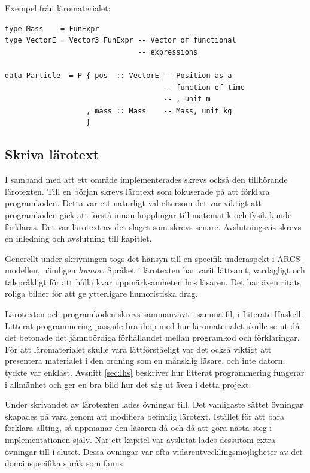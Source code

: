 Exempel från läromaterialet:
\begin{lstlisting}[frame=none, belowskip=-0.5\baselineskip, xleftmargin=0.5in]
type Mass    = FunExpr
type VectorE = Vector3 FunExpr -- Vector of functional 
                               -- expressions

data Particle  = P { pos  :: VectorE -- Position as a 
                                     -- function of time
                                     -- , unit m
                   , mass :: Mass    -- Mass, unit kg
                   }
\end{lstlisting}

\subsection{Skriva lärotext}

I samband med att ett område implementerades skrevs också den tillhörande
lärotexten. Till en början skrevs lärotext som fokuserade på att förklara
programkoden. Detta var ett naturligt val eftersom det var viktigt att
programkoden gick att förstå innan kopplingar till matematik och fysik kunde
förklaras. Det var lärotext av det slaget som skrevs senare.
Avslutningsvis skrevs en inledning och avslutning till kapitlet.

Generellt under skrivningen togs det hänsyn till en specifik underaspekt i ARCS-modellen, nämligen \textit{humor}. Språket i lärotexten har varit lättsamt, vardagligt och talspråkligt för att hålla kvar uppmärksamheten hos läsaren. Det har även ritats roliga bilder för att ge ytterligare humoristiska drag.

Lärotexten och programkoden skrevs sammanvävt i samma fil, i Literate
Haskell. Litterat programmering passade bra ihop med
hur läromaterialet skulle se ut då det betonade det jämnbördiga förhållandet
mellan programkod och förklaringar. För att läromaterialet skulle vara
lättförståeligt var det också viktigt att presentera materialet i den ordning
som en mänsklig läsare, och inte datorn, tyckte var enklast. Avsnitt \ref{sec:lhs} beskriver hur litterat programmering fungerar i allmänhet och ger
en bra bild hur det såg ut även i detta projekt.

Under skrivandet av lärotexten lades övningar till. Det vanligaste sättet övningar skapades på vara genom att modifiera befintlig lärotext. Istället för att bara förklara allting, så uppmanar den läsaren då och då att göra nästa steg i
implementationen själv. När
ett kapitel var avslutat lades dessutom extra övningar till i slutet. Dessa
övningar var ofta vidareutvecklingsmöjligheter av det domänspecifika språk som
fanns.

